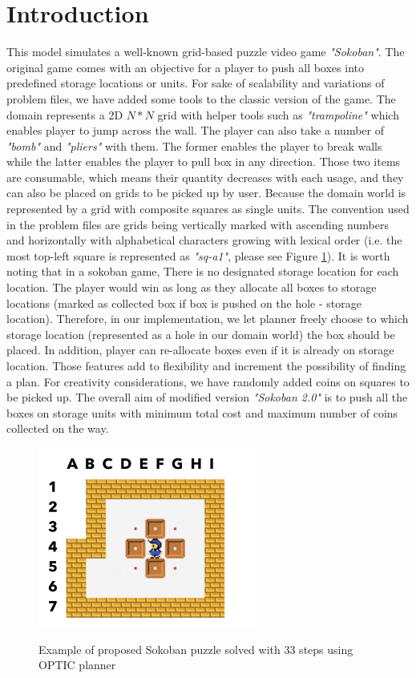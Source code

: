 \documentclass[letterpaper]{article} %
\begin{document}
\section{Introduction}
This model simulates a well-known grid-based puzzle video game \emph{"Sokoban"}. The original game comes with an 
objective for a player to push all boxes into predefined storage locations or units. For sake of scalability
and variations of problem files, we have added some tools to the classic version of the game. The domain represents
a 2D \(N*N\) grid with helper tools such as \emph{"trampoline"} which enables player to jump across the wall.
The player can also take a number of \emph{"bomb"} and \emph{"pliers"} with them. The former enables the player to
break walls while the latter enables the player to pull box in any direction. Those two items are consumable, which
means their quantity decreases with each usage, and they can also be placed on grids to be picked up by user.
Because the domain world is represented by a grid with composite squares as single units. The convention used in the 
problem files are grids being vertically marked with ascending numbers and horizontally with alphabetical characters 
growing with lexical order (i.e. the most top-left square is represented as \emph{"sq-a1"}, please see Figure \ref{fig:example}).  
It is worth noting that in a sokoban game, There is no designated storage location for each location. The player
would win as long as they allocate all boxes to storage locations (marked as collected box if box is pushed on the hole
- storage location). Therefore, in our implementation, we let planner freely choose to which storage location 
(represented as a hole in our domain world) the box should be placed. In addition, player can re-allocate boxes even 
if it is already on storage location. Those features add to flexibility and increment the possibility of finding a 
plan. For creativity considerations, we have randomly added coins on squares to be picked up. The overall aim of modified
version \emph{"Sokoban 2.0"} is to push all the boxes on storage units with minimum total cost and maximum number of coins collected on the way.  
\begin{figure}
    \includegraphics[width=2.8in]{figure1.JPG} \\
    \caption{Example of proposed Sokoban puzzle solved with 33 steps using OPTIC planner}\label{fig:example}
\end{figure}
\end{document}
